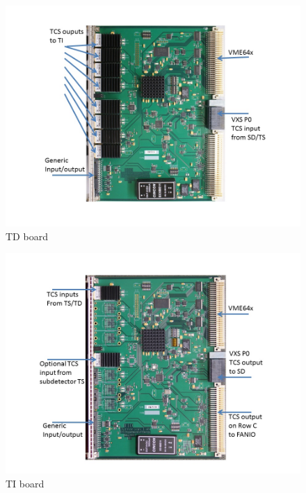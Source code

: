 \begin{figure}[hbt]
	\centering
	\includegraphics[width=1.0\columnwidth,keepaspectratio]{img/TDused.jpg}
	\caption{TD board}
	\label{fig:TDused}
\end{figure}

\begin{figure}[hbt]
	\centering
	\includegraphics[width=1.0\columnwidth,keepaspectratio]{img/TIused.jpg}
	\caption{TI board}
	\label{fig:TIused}
\end{figure}

